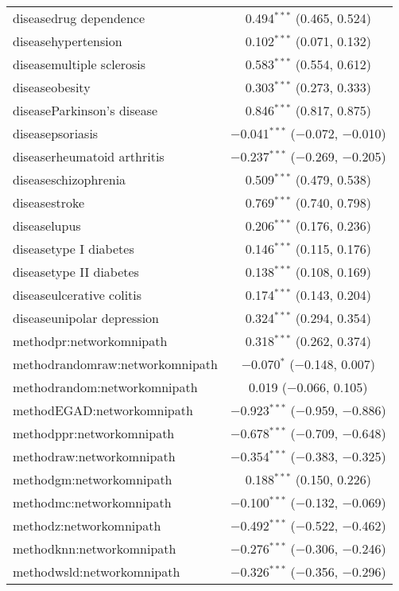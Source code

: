 \begin{table}[!htbp]
\begin{tabular}{@{\extracolsep{5pt}}lc}
  diseasedrug dependence & 0.494$^{***}$ (0.465, 0.524) \\ 
  diseasehypertension & 0.102$^{***}$ (0.071, 0.132) \\ 
  diseasemultiple sclerosis & 0.583$^{***}$ (0.554, 0.612) \\ 
  diseaseobesity & 0.303$^{***}$ (0.273, 0.333) \\ 
  diseaseParkinson's disease & 0.846$^{***}$ (0.817, 0.875) \\ 
  diseasepsoriasis & $-$0.041$^{***}$ ($-$0.072, $-$0.010) \\ 
  diseaserheumatoid arthritis & $-$0.237$^{***}$ ($-$0.269, $-$0.205) \\ 
  diseaseschizophrenia & 0.509$^{***}$ (0.479, 0.538) \\ 
  diseasestroke & 0.769$^{***}$ (0.740, 0.798) \\ 
  diseaselupus & 0.206$^{***}$ (0.176, 0.236) \\ 
  diseasetype I diabetes & 0.146$^{***}$ (0.115, 0.176) \\ 
  diseasetype II diabetes & 0.138$^{***}$ (0.108, 0.169) \\ 
  diseaseulcerative colitis & 0.174$^{***}$ (0.143, 0.204) \\ 
  diseaseunipolar depression & 0.324$^{***}$ (0.294, 0.354) \\ 
  methodpr:networkomnipath & 0.318$^{***}$ (0.262, 0.374) \\ 
  methodrandomraw:networkomnipath & $-$0.070$^{*}$ ($-$0.148, 0.007) \\ 
  methodrandom:networkomnipath & 0.019 ($-$0.066, 0.105) \\ 
  methodEGAD:networkomnipath & $-$0.923$^{***}$ ($-$0.959, $-$0.886) \\ 
  methodppr:networkomnipath & $-$0.678$^{***}$ ($-$0.709, $-$0.648) \\ 
  methodraw:networkomnipath & $-$0.354$^{***}$ ($-$0.383, $-$0.325) \\ 
  methodgm:networkomnipath & 0.188$^{***}$ (0.150, 0.226) \\ 
  methodmc:networkomnipath & $-$0.100$^{***}$ ($-$0.132, $-$0.069) \\ 
  methodz:networkomnipath & $-$0.492$^{***}$ ($-$0.522, $-$0.462) \\ 
  methodknn:networkomnipath & $-$0.276$^{***}$ ($-$0.306, $-$0.246) \\ 
  methodwsld:networkomnipath & $-$0.326$^{***}$ ($-$0.356, $-$0.296) \\ 

\end{tabular}
\end{table}
